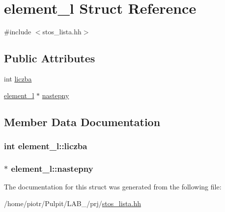 \hypertarget{structelement__l}{\section{element\-\_\-l \-Struct \-Reference}
\label{structelement__l}
}


{\ttfamily \#include $<$stos\-\_\-lista.\-hh$>$}

\subsection*{\-Public \-Attributes}
\begin{DoxyCompactItemize}
\item 
int \hyperlink{structelement__l_ad273cf0aa12c8460f95b71bfdc162396}{liczba}
\item 
\hyperlink{structelement__l}{element\-\_\-l} $\ast$ \hyperlink{structelement__l_a680ef523d73bb7361809d69d793ecffe}{nastepny}
\end{DoxyCompactItemize}


\subsection{\-Member \-Data \-Documentation}
\hypertarget{structelement__l_ad273cf0aa12c8460f95b71bfdc162396}{
\subsubsection[{liczba}]{\setlength{\rightskip}{0pt plus 5cm}int {\bf element\-\_\-l\-::liczba}}}\label{structelement__l_ad273cf0aa12c8460f95b71bfdc162396}
\hypertarget{structelement__l_a680ef523d73bb7361809d69d793ecffe}{
\subsubsection[{nastepny}]{$\ast$ {\bf element\-\_\-l\-::nastepny}}}\label{structelement__l_a680ef523d73bb7361809d69d793ecffe}


\-The documentation for this struct was generated from the following file\-:\begin{DoxyCompactItemize}
\item 
/home/piotr/\-Pulpit/\-L\-A\-B\-\_/prj/\hyperlink{stos__lista_8hh}{stos\-\_\-lista.\-hh}\end{DoxyCompactItemize}
